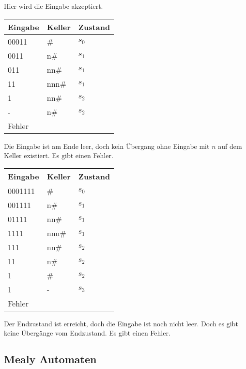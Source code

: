 Hier wird die Eingabe akzeptiert.

\begin{table}[h]
    \begin{tabular}{|l|l|l|}
    \hline
    Eingabe & Keller & Zustand \\ \hline
    00011 & \# & $s_0$ \\ \hline
    0011 & n\# & $s_1$ \\ \hline
    011 & nn\# & $s_1$ \\ \hline
    11 & nnn\# & $s_1$ \\ \hline
    1 & nn\# & $s_2$ \\ \hline
    - & n\# & $s_2$ \\ \hline
    \multicolumn{3}{|l|}{Fehler} \\ \hline
    \end{tabular}
\end{table}

Die Eingabe ist am Ende leer, doch kein Übergang ohne Eingabe mit $n$
auf dem Keller existiert. Es gibt einen Fehler.

\begin{table}[h]
    \begin{tabular}{|l|l|l|}
    \hline
    Eingabe & Keller & Zustand \\ \hline
    0001111 & \# & $s_0$ \\ \hline
    001111 & n\# & $s_1$ \\ \hline
    01111 & nn\# & $s_1$ \\ \hline
    1111 & nnn\# & $s_1$ \\ \hline
    111 & nn\# & $s_2$ \\ \hline
    11 & n\# & $s_2$ \\ \hline
    1 & \# & $s_2$ \\ \hline
    1 & - & $s_3$ \\ \hline
    \multicolumn{3}{|l|}{Fehler} \\ \hline
\end{tabular}
\end{table}

Der Endzustand ist erreicht, doch die Eingabe ist noch nicht leer.
Doch es gibt keine Übergänge vom Endzustand. Es gibt einen Fehler.

\clearpage

\subsection{Mealy Automaten}

